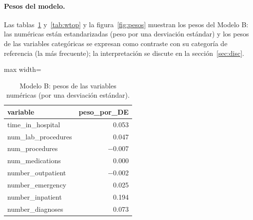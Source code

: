 \documentclass[11pt,a4paper]{article}
\newenvironment{tablaentex}[2]{%
  \begin{table}[H]\centering\small\caption{#1}\label{#2}\begin{adjustbox}{max width=\textwidth}}%
  {\end{adjustbox}\end{table}}
\begin{document}
\paragraph{Pesos del modelo.}
Las tablas~\ref{tab:wnum} y~\ref{tab:wtop} y la figura~\ref{fig:pesos} muestran los pesos del Modelo B: las numéricas están estandarizadas (peso por una desviación estándar) y los pesos de las variables categóricas se expresan como contraste con su categoría de referencia (la más frecuente); la interpretación se discute en la sección~\ref{sec:disc}.
\begin{tablaentex}{Modelo B: pesos de las variables numéricas (por una desviación estándar).}{tab:wnum}
\begin{tabular}{lr}
\toprule
variable & peso\_por\_DE \\
\midrule
time\_in\_hospital & 0.053 \\
num\_lab\_procedures & 0.047 \\
num\_procedures & $-$0.007 \\
num\_medications & 0.000 \\
number\_outpatient & $-$0.002 \\
number\_emergency & 0.025 \\
number\_inpatient & 0.194 \\
number\_diagnoses & 0.073 \\
\bottomrule
\end{tabular}
\end{tablaentex}
\end{document}
